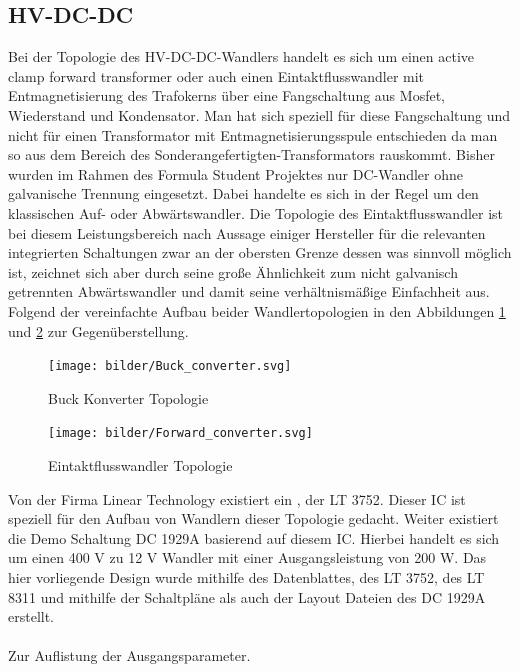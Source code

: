 \FloatBarrier
\subsection{\ac{HV}-DC-DC}
Bei der Topologie des \ac{HV}-DC-DC-Wandlers handelt es sich um einen active clamp forward transformer oder auch einen Eintaktflusswandler mit Entmagnetisierung des Trafokerns über eine Fangschaltung aus Mosfet, Wiederstand und Kondensator. Man hat sich speziell für diese Fangschaltung und nicht für einen Transformator mit Entmagnetisierungsspule entschieden da man so aus dem Bereich des Sonderangefertigten-Transformators rauskommt. Bisher wurden im Rahmen des Formula Student Projektes nur DC-Wandler ohne galvanische Trennung eingesetzt. Dabei handelte es sich in der Regel um den klassischen Auf- oder Abwärtswandler. Die Topologie des Eintaktflusswandler ist bei diesem Leistungsbereich nach Aussage einiger Hersteller für die relevanten integrierten Schaltungen zwar an der obersten Grenze dessen was sinnvoll möglich ist, zeichnet sich aber durch seine große Ähnlichkeit zum nicht galvanisch getrennten Abwärtswandler und damit seine verhältnismäßige Einfachheit aus. Folgend der vereinfachte Aufbau beider Wandlertopologien in den Abbildungen \ref{fig:buckconverter} und \ref{fig:forwardconverter} zur Gegenüberstellung.

\begin{figure}
	\centering
	\texttt{[image: bilder/Buck\_converter.svg]}
	\caption{Buck Konverter Topologie}
	\label{fig:buckconverter}
\end{figure}

\begin{figure}
	\centering
	\texttt{[image: bilder/Forward\_converter.svg]}
	\caption{Eintaktflusswandler Topologie}
	\label{fig:forwardconverter}
\end{figure}

Von der Firma Linear Technology existiert ein , der LT 3752. Dieser \ac{IC} ist speziell für den Aufbau von Wandlern dieser Topologie gedacht. Weiter existiert die Demo Schaltung DC 1929A basierend auf diesem \ac{IC}. Hierbei handelt es sich um einen 400 V zu 12 V Wandler mit einer Ausgangsleistung von 200 W. Das hier vorliegende Design wurde mithilfe des Datenblattes, des LT 3752, des LT 8311 und mithilfe der Schaltpläne als auch der Layout Dateien des DC 1929A erstellt.
\\
\\
Zur Auflistung der Ausgangsparameter.


